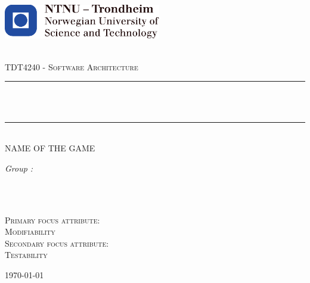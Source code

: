 \begin{titlepage}
\includegraphics[height=1.5cm]{images/ntnu_logo.pdf}\\[1cm]   
\begin{center}

 
~\\[1.5cm]

\textsc{\Large TDT4240 - Software Architecture}\\[0.5cm]

\hrule ~\\[0.2cm]
{\huge \bfseries \mytitle}\\[0.4cm]		%
\hrule ~\\[1.5cm]

\textsc{\Large NAME OF THE GAME}\\[0.5cm]

\begin{minipage}{0.4\textwidth}
    \centering
	\large
		\emph{Group \mygroupnumber:}\\~\\
		\myauthor
\end{minipage}\\[0.5cm]



\begin{minipage}{0.4\textwidth}
    \centering
    \textsc{Primary focus attribute:\\Modifiability}\\[0.5cm]
    \textsc{Secondary focus attribute:\\Testability}\\[0.5cm]

\end{minipage}
\vfill
{\large \today}

\end{center}
\end{titlepage}